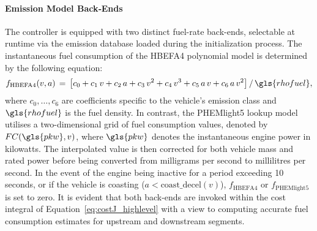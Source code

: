 \paragraph{Emission Model Back‐Ends} 
The controller is equipped with two distinct fuel-rate back-ends, selectable at runtime via the emission database loaded during the initialization process. The instantaneous fuel consumption of the HBEFA4 polynomial model is determined by the following equation:
\begin{equation}
   f_{\mathrm{HBEFA4}}(v,a) 
    \,=\, 
    \bigl[c_0 + c_1\,v + c_2\,a + c_3\,v^2 + c_4\,v^3 + c_5\,a\,v + c_6\,a\,v^2 \bigr] \,/\, \gls{rhofuel}, 
\end{equation}
where $c_0,\dots,c_6$ are coefficients specific to the vehicle’s emission class and $\gls{rhofuel}$ is the fuel density. In contrast, the PHEMlight5 lookup model utilises a two-dimensional grid of fuel consumption values, denoted by ${FC}(\gls{pkw},v)$, where $\gls{pkw}$ denotes the instantaneous engine power in kilowatts. The interpolated value is then corrected for both vehicle mass and rated power before being converted from milligrams per second to millilitres per second. In the event of the engine being inactive for a period exceeding 10 seconds, or if the vehicle is coasting ($a < \text{coast\_decel}(v)$), $f_{\mathrm{HBEFA4}}$ or $f_{\mathrm{PHEMlight5}}$ is set to zero. It is evident that both back-ends are invoked within the cost integral of Equation~\ref{eq:costJ_highlevel} with a view to computing accurate fuel consumption estimates for upstream and downstream segments.